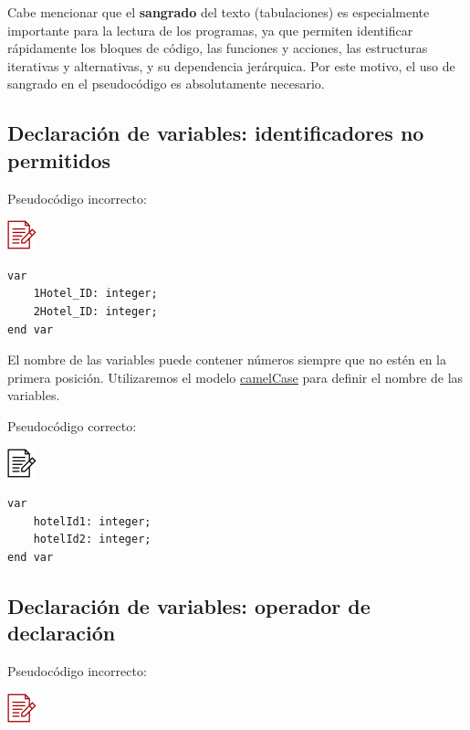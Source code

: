 \documentclass[
]{book}
\begin{document}
Cabe mencionar que el \textbf{sangrado} del texto (tabulaciones) es especialmente importante para la lectura de los programas, ya que permiten identificar rápidamente los bloques de código, las funciones y acciones, las estructuras iterativas y alternativas, y su dependencia jerárquica. Por este motivo, el uso de sangrado en el pseudocódigo es absolutamente necesario.

\hypertarget{declaraciuxf3n-de-variables-identificadores-no-permitidos}{%
\subsection{Declaración de variables: identificadores no permitidos}\label{declaraciuxf3n-de-variables-identificadores-no-permitidos}}

Pseudocódigo incorrecto:

\includegraphics{./img/alg_err.png}

\begin{verbatim}
var
    1Hotel_ID: integer;
    2Hotel_ID: integer;
end var
\end{verbatim}

El nombre de las variables puede contener números siempre que no estén en la primera posición. Utilizaremos el modelo \href{https://en.wikipedia.org/wiki/Camel_case}{camelCase} para definir el nombre de las variables.

Pseudocódigo correcto:

\includegraphics{./img/alg.png}

\begin{verbatim}
var
    hotelId1: integer;
    hotelId2: integer;
end var
\end{verbatim}

\hypertarget{declaraciuxf3n-de-variables-operador-de-declaraciuxf3n}{%
\subsection{Declaración de variables: operador de declaración}\label{declaraciuxf3n-de-variables-operador-de-declaraciuxf3n}}

Pseudocódigo incorrecto:

\includegraphics{./img/alg_err.png}
\end{document}
